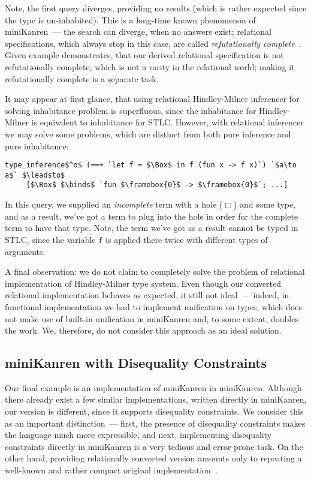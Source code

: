 Note, the first query diverges, providing no results (which is rather expected since the type is un-inhabited). This is a long-time known phenomenon of
miniKanren~--- the search can diverge, when no answers exist; relational specifications, which always stop in this case, are called
\emph{refutationally complete}~\cite{WillThesis}. Given example demonstrates, that our derived relational specification is not refutationally
complete, which is not a rarity in the relational world; making it refutationally complete is a separate task.

It may appear at first glance, that using relational Hindley-Milner inferencer for solving inhabitance problem is superfluous, since the inhabitance for
Hindley-Milner is equivalent to inhabitance for STLC. However, with relational inferencer we may solve some problems, which are distinct from
both pure inference and pure inhabitance:

\begin{lstlisting}[basicstyle=\small]
   type_inference$^o$ (=== `let f = $\Box$ in f (fun x -> f x)`) `$a\to a$` $\leadsto$ 
     [$\Box$ $\binds$ `fun $\framebox{0}$ -> $\framebox{0}$`; ...]
\end{lstlisting}

In this query, we supplied an \emph{incomplete} term with a hole ($\Box$) and some type, and as a result, we've got a term to plug into the hole 
in order for the complete term to have that type. Note, the term we've got as a result cannot be typed in STLC, since the variable \lstinline|f|
is applied there twice with different types of arguments.

A final observation: we do not claim to completely solve the problem of relational implementation of Hindley-Milner type system. Even though our converted
relational implementation behaves as expected, it still not ideal~--- indeed, in functional implementation we had to implement unification on types, 
which does not make use of built-in unification in miniKanren and, to some extent, doubles the work. We, therefore, do not consider this approach as an ideal solution.

\subsection{miniKanren with Disequality Constraints}

Our final example is an implementation of miniKanren in miniKanren. Although there already exist a few similar implementations, written directly in miniKanren, 
our version is different, since it supports disequality constraints. We consider this as an important distinction~--- first, the presence of disequality
constraints makes the language much more expressible, and next, implementing disequality constraints directly in miniKanren is a very tedious
and error-prone task. On the other hand, providing relationally converted version amounts only to repeating a well-known and rather compact original 
implementation~\cite{CKanren}.

